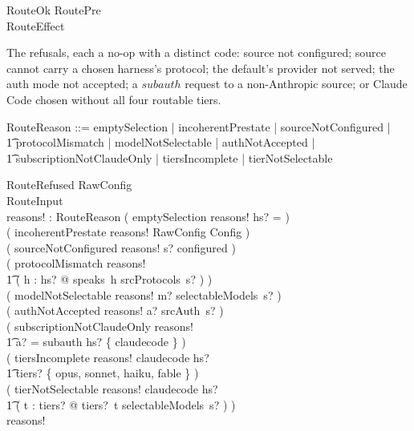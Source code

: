 \documentclass{article}
\begin{document}
\begin{schema}{RouteOk}
	RoutePre \\
	RouteEffect
\end{schema}

The refusals, each a no-op with a distinct code: source not configured; source
cannot carry a chosen harness's protocol; the default's provider not served; the
auth mode not accepted; a $subauth$ request to a non-Anthropic source; or Claude
Code chosen without all four routable tiers.

\begin{zed}
	RouteReason ::= emptySelection | incoherentPrestate | sourceNotConfigured | \\
	\t1 protocolMismatch | modelNotSelectable | authNotAccepted | \\
	\t1 subscriptionNotClaudeOnly | tiersIncomplete | tierNotSelectable
\end{zed}

\begin{schema}{RouteRefused}
	\Xi RawConfig \\
	RouteInput \\
	reasons! : \power RouteReason
	\where
	( emptySelection \in reasons! \iff hs? = \emptyset ) \\
	( incoherentPrestate \in reasons! \iff \theta RawConfig \notin Config ) \\
	( sourceNotConfigured \in reasons! \iff s? \notin configured ) \\
	( protocolMismatch \in reasons! \iff \\
	\t1 ( \exists h : hs? @ speaks~h \notin srcProtocols~s? ) ) \\
	( modelNotSelectable \in reasons! \iff m? \notin selectableModels~s? ) \\
	( authNotAccepted \in reasons! \iff a? \notin srcAuth~s? ) \\
	( subscriptionNotClaudeOnly \in reasons! \iff \\
	\t1 a? = subauth \land hs? \neq \{ claudecode \} ) \\
	( tiersIncomplete \in reasons! \iff claudecode \in hs? \land \\
	\t1 \dom tiers? \neq \{ opus, sonnet, haiku, fable \} ) \\
	( tierNotSelectable \in reasons! \iff claudecode \in hs? \land \\
	\t1 ( \exists t : \dom tiers? @ tiers?~t \notin selectableModels~s? ) ) \\
	reasons! \neq \emptyset
\end{schema}
\end{document}
